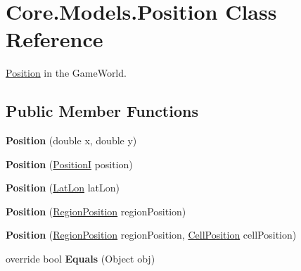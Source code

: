 \hypertarget{classCore_1_1Models_1_1Position}{\section{Core.\-Models.\-Position Class Reference}
\label{classCore_1_1Models_1_1Position}
}


\hyperlink{classCore_1_1Models_1_1Position}{Position} in the Game\-World.  


\subsection*{Public Member Functions}
\begin{DoxyCompactItemize}
\item 
\hypertarget{classCore_1_1Models_1_1Position_ab6b49792138b5a0a22e13525acdacc9a}{{\bfseries Position} (double x, double y)}\label{classCore_1_1Models_1_1Position_ab6b49792138b5a0a22e13525acdacc9a}

\item 
\hypertarget{classCore_1_1Models_1_1Position_a86b378bb7e6fbd16182fe0b169d23897}{{\bfseries Position} (\hyperlink{classCore_1_1Models_1_1PositionI}{Position\-I} position)}\label{classCore_1_1Models_1_1Position_a86b378bb7e6fbd16182fe0b169d23897}

\item 
\hypertarget{classCore_1_1Models_1_1Position_a776d640b97d31e7460fe4a850299a4f0}{{\bfseries Position} (\hyperlink{classCore_1_1Models_1_1LatLon}{Lat\-Lon} lat\-Lon)}\label{classCore_1_1Models_1_1Position_a776d640b97d31e7460fe4a850299a4f0}

\item 
\hypertarget{classCore_1_1Models_1_1Position_a74d6d9f0c6f39849f0515b1c837fa2ef}{{\bfseries Position} (\hyperlink{classCore_1_1Models_1_1RegionPosition}{Region\-Position} region\-Position)}\label{classCore_1_1Models_1_1Position_a74d6d9f0c6f39849f0515b1c837fa2ef}

\item 
\hypertarget{classCore_1_1Models_1_1Position_a71cb4b1cddaf9ee97c7786089b2918ba}{{\bfseries Position} (\hyperlink{classCore_1_1Models_1_1RegionPosition}{Region\-Position} region\-Position, \hyperlink{classCore_1_1Models_1_1CellPosition}{Cell\-Position} cell\-Position)}\label{classCore_1_1Models_1_1Position_a71cb4b1cddaf9ee97c7786089b2918ba}

\item 
\hypertarget{classCore_1_1Models_1_1Position_a9c713f10666bffd4a69403ec80104dbe}{override bool {\bfseries Equals} (Object obj)}\label{classCore_1_1Models_1_1Position_a9c713f10666bffd4a69403ec80104dbe}


\end{DoxyCompactItemize}
